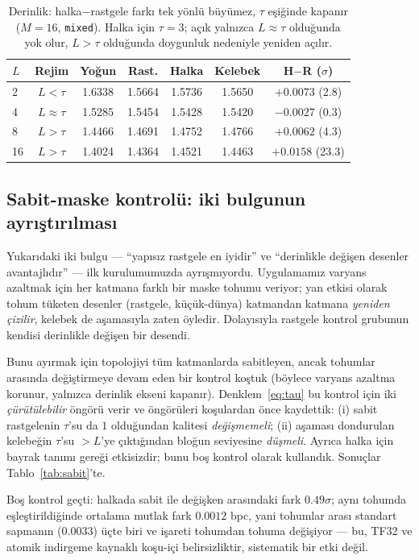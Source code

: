\documentclass[10pt,journal]{IEEEtran}
\begin{document}
\begin{table}[!t]
\centering
\footnotesize
\caption{Derinlik: halka$-$rastgele farkı tek yönlü büyümez, $\tau$ eşiğinde kapanır
($M{=}16$, \texttt{mixed}). Halka için $\tau{=}3$; açık yalnızca $L{\approx}\tau$ olduğunda
yok olur, $L>\tau$ olduğunda doygunluk nedeniyle yeniden açılır.}
\label{tab:derinlik}
\begin{tabular}{@{}lcccccc@{}}
\toprule
$L$ & Rejim & Yoğun & Rast. & Halka & Kelebek & H$-$R ($\sigma$) \\
\midrule
2  & $L<\tau$      & 1.6338 & 1.5664 & 1.5736 & 1.5650 & $+0.0073$ (2.8) \\
4  & $L\approx\tau$& 1.5285 & 1.5454 & 1.5428 & 1.5420 & $-0.0027$ (0.3) \\
8  & $L>\tau$      & 1.4466 & 1.4691 & 1.4752 & 1.4766 & $+0.0062$ (4.3) \\
16 & $L>\tau$      & 1.4024 & 1.4364 & 1.4521 & 1.4463 & $+0.0158$ (23.3) \\
\bottomrule
\end{tabular}
\end{table}

\subsection{Sabit-maske kontrolü: iki bulgunun ayrıştırılması}
\label{sec:sabit}
Yukarıdaki iki bulgu --- ``yapısız rastgele en iyidir'' ve ``derinlikle değişen desenler
avantajlıdır'' --- ilk kurulumumuzda ayrışmıyordu. Uygulamamız varyans azaltmak için her
katmana farklı bir maske tohumu veriyor; yan etkisi olarak tohum tüketen desenler (rastgele,
küçük-dünya) katmandan katmana \emph{yeniden çizilir}, kelebek de aşamasıyla zaten öyledir.
Dolayısıyla rastgele kontrol grubunun kendisi derinlikle değişen bir desendi.

Bunu ayırmak için topolojiyi tüm katmanlarda sabitleyen, ancak tohumlar arasında değiştirmeye
devam eden bir kontrol koştuk (böylece varyans azaltma korunur, yalnızca derinlik ekseni
kapanır). Denklem~\eqref{eq:tau} bu kontrol için iki \emph{çürütülebilir} öngörü verir ve
öngörüleri koşulardan önce kaydettik: (i) sabit rastgelenin $\tau$'su da $1$ olduğundan
kalitesi \emph{değişmemeli}; (ii) aşaması dondurulan kelebeğin $\tau$'su $>L$'ye çıktığından
bloğun seviyesine \emph{düşmeli}. Ayrıca halka için bayrak tanımı gereği etkisizdir; bunu boş
kontrol olarak kullandık. Sonuçlar Tablo~\ref{tab:sabit}'te.

Boş kontrol geçti: halkada sabit ile değişken arasındaki fark $0.49\sigma$; aynı tohumda
eşleştirildiğinde ortalama mutlak fark $0.0012$ bpc, yani tohumlar arası standart sapmanın
($0.0033$) üçte biri ve işareti tohumdan tohuma değişiyor --- bu, TF32 ve atomik indirgeme
kaynaklı koşu-içi belirsizliktir, sistematik bir etki değil.
\end{document}
